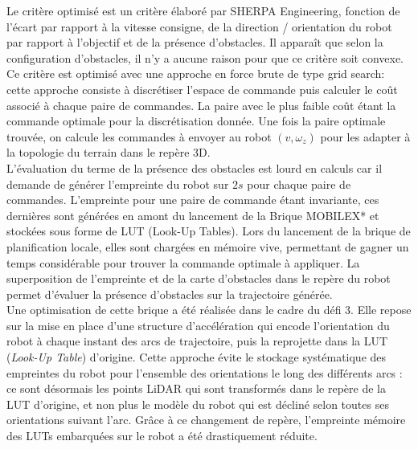 \indent Le critère optimisé est un critère élaboré par SHERPA Engineering, fonction de l'écart par rapport à la vitesse consigne, de la direction / orientation du robot par rapport à l'objectif et de la présence d'obstacles. Il apparaît que selon la configuration d'obstacles, il n'y a aucune raison pour que ce critère soit convexe. Ce critère est optimisé avec une approche en force brute de type grid search: cette approche consiste à discrétiser l'espace de commande puis calculer le coût associé à chaque paire de commandes. La paire avec le plus faible coût étant la commande optimale pour la discrétisation donnée. Une fois la paire optimale trouvée, on calcule les commandes à envoyer au robot $(v,\omega_z)$ pour les adapter à la topologie du terrain dans le repère 3D.\\

\indent L'évaluation du terme de la présence des obstacles est lourd en calculs car il demande de générer l'empreinte du robot sur $2 s$ pour chaque paire de commandes. L'empreinte pour une paire de commande étant invariante, ces dernières sont générées en amont du lancement de la Brique MOBILEX* et stockées sous forme de LUT (Look-Up Tables). Lors du lancement de la brique de planification locale, elles sont chargées en mémoire vive, permettant de gagner un temps considérable pour trouver la commande optimale à appliquer. La superposition de l'empreinte et de la carte d'obstacles dans le repère du robot permet d'évaluer la présence d'obstacles sur la trajectoire générée.\\

\indent Une optimisation de cette brique a été réalisée dans le cadre du défi 3. Elle repose sur la mise en place d'une structure d'accélération qui encode l'orientation du robot à chaque instant des arcs de trajectoire, puis la reprojette dans la LUT (\textit{Look-Up Table}) d'origine. Cette approche évite le stockage systématique des empreintes du robot pour l'ensemble des orientations le long des différents arcs : ce sont désormais les points LiDAR qui sont transformés dans le repère de la LUT d'origine, et non plus le modèle du robot qui est décliné selon toutes ses orientations suivant l'arc. Grâce à ce changement de repère, l'empreinte mémoire des LUTs embarquées sur le robot a été drastiquement réduite.


